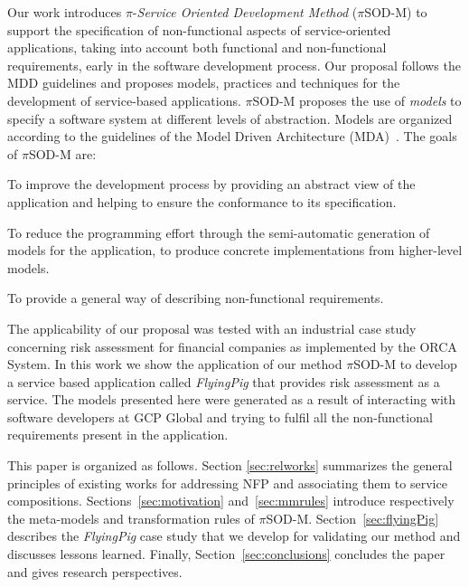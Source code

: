\documentclass{singlecol-new}
\theoremstyle{TH}{
\newtheorem{lemma}{Lemma}
\newtheorem{theorem}[lemma]{Theorem}
\newtheorem{corrolary}[lemma]{Corrolary}
\newtheorem{conjecture}[lemma]{Conjecture}
\newtheorem{proposition}[lemma]{Proposition}
\newtheorem{claim}[lemma]{Claim}
\newtheorem{stheorem}[lemma]{Wrong Theorem}
\newtheorem{algorithm}{Algorithm}
}
\theoremstyle{THrm}{
\newtheorem{definition}{Definition}[section]
\newtheorem{question}{Question}[section]
\newtheorem{remark}{Remark}
\newtheorem{scheme}{Scheme}
}
\theoremstyle{THhit}{
\newtheorem{case}{Case}[section]
}
\theoremstyle{THhsl}{
\newtheorem{example}{Example}
}
\newcommand{\pisodm}[0]{$\pi$SOD-M\xspace}
\def\FlyingPig{\textsl{FlyingPig}\xspace}
\begin{document}
Our work introduces $\pi$-\textit{Service Oriented Development Method} (\pisodm) to support the specification of non-functional aspects of service-oriented applications, taking into account both functional and non-functional requirements, early in the software development process.
Our proposal follows the MDD guidelines and proposes models, practices and techniques for the development of service-based applications.  
\pisodm proposes  the use of \textit{models} to specify a software system at different levels of abstraction.
Models are organized according to the guidelines of the Model Driven Archi\-tec\-ture (MDA)~\cite{miller}.
The goals of  \pisodm are:

\begin{compactenum}[i]
\item To improve the development process by providing an abstract view of the application and helping to ensure the conformance to its specification.
\item To reduce the programming effort through the semi-automatic generation of  models for the application,  to produce concrete implementations from higher-level models.
\item To provide a general way of describing non-functional requirements.
\end{compactenum}

The applicability of our proposal was tested with an industrial case study concerning risk assessment for financial companies as implemented by the ORCA System\footnotemark {}. In this work we show the application of our method \pisodm to develop a service based application called \FlyingPig that provides risk assessment as a service.
The models presented here were generated as a result of interacting with software developers at GCP Global and trying to fulfil  all the non-functional requirements present in the application.

This paper is organized as follows.
Sec\-tion \ref{sec:relworks} summarizes the general principles of existing works for addressing NFP and associating them to service compositions.
Sections~\ref{sec:motivation} and~\ref{sec:mmrules} introduce respectively the meta-models and transformation rules of \pisodm.
Section~\ref{sec:flyingPig} describes the \FlyingPig case study that we develop for validating our method and discusses lessons learned.
Finally, Section~\ref{sec:conclusions} concludes the paper and gives research perspectives.
\end{document}
